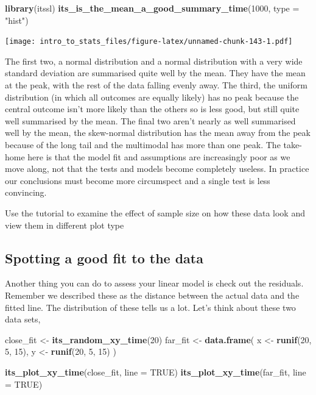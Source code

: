 \documentclass[
]{book}
\newenvironment{Shaded}{\begin{snugshade}}{\end{snugshade}}
\newcommand{\DataTypeTok}[1]{\textcolor[rgb]{0.13,0.29,0.53}{#1}}
\newcommand{\DecValTok}[1]{\textcolor[rgb]{0.00,0.00,0.81}{#1}}
\newcommand{\KeywordTok}[1]{\textcolor[rgb]{0.13,0.29,0.53}{\textbf{#1}}}
\newcommand{\NormalTok}[1]{#1}
\newcommand{\OtherTok}[1]{\textcolor[rgb]{0.56,0.35,0.01}{#1}}
\newcommand{\StringTok}[1]{\textcolor[rgb]{0.31,0.60,0.02}{#1}}
\newenvironment{task}
{ \begin{tcolorbox}[title=For you to do,title filled] }
{  \end{tcolorbox} }
\begin{document}
\begin{Shaded}
\begin{Highlighting}[]
\KeywordTok{library}\NormalTok{(itssl)}
\KeywordTok{its_is_the_mean_a_good_summary_time}\NormalTok{(}\DecValTok{1000}\NormalTok{, }\DataTypeTok{type =} \StringTok{"hist"}\NormalTok{)}
\end{Highlighting}
\end{Shaded}

\texttt{[image: intro\_to\_stats\_files/figure-latex/unnamed-chunk-143-1.pdf]}

The first two, a normal distribution and a normal distribution with a very wide standard deviation are summarised quite well by the mean. They have the mean at the peak, with the rest of the data falling evenly away. The third, the uniform distribution (in which all outcomes are equally likely) has no peak because the central outcome isn't more likely than the others so is less good, but still quite well summarised by the mean. The final two aren't nearly as well summarised well by the mean, the skew-normal distribution has the mean away from the peak because of the long tail and the multimodal has more than one peak. The take-home here is that the model fit and assumptions are increasingly poor as we move along, not that the tests and models become completely useless. In practice our conclusions must become more circumspect and a single test is less convincing.

\begin{task}
Use the tutorial to examine the effect of sample size on how these data look and view them in different plot type
\end{task}

\hypertarget{spotting-a-good-fit-to-the-data}{%
\subsection{Spotting a good fit to the data}\label{spotting-a-good-fit-to-the-data}}

Another thing you can do to assess your linear model is check out the residuals. Remember we described these as the distance between the actual data and the fitted line. The distribution of these tells us a lot. Let's think about these two data sets,

\begin{Shaded}
\begin{Highlighting}[]
\NormalTok{close_fit <-}\StringTok{ }\KeywordTok{its_random_xy_time}\NormalTok{(}\DecValTok{20}\NormalTok{)}
\NormalTok{far_fit <-}\StringTok{ }\KeywordTok{data.frame}\NormalTok{(}
\NormalTok{  x <-}\StringTok{ }\KeywordTok{runif}\NormalTok{(}\DecValTok{20}\NormalTok{, }\DecValTok{5}\NormalTok{, }\DecValTok{15}\NormalTok{),}
\NormalTok{  y <-}\StringTok{ }\KeywordTok{runif}\NormalTok{(}\DecValTok{20}\NormalTok{, }\DecValTok{5}\NormalTok{, }\DecValTok{15}\NormalTok{)}
\NormalTok{)}

\KeywordTok{its_plot_xy_time}\NormalTok{(close_fit, }\DataTypeTok{line =} \OtherTok{TRUE}\NormalTok{)}
\KeywordTok{its_plot_xy_time}\NormalTok{(far_fit, }\DataTypeTok{line =} \OtherTok{TRUE}\NormalTok{)}
\end{Highlighting}
\end{Shaded}
\end{document}
